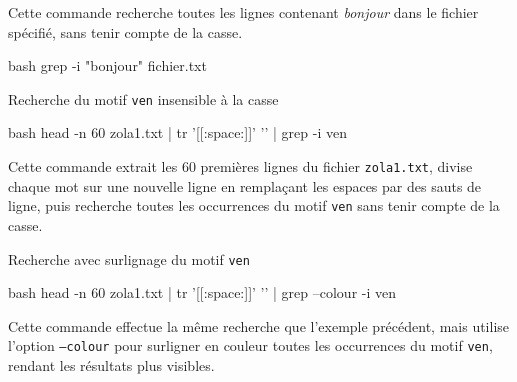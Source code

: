 \documentclass[a4paper, 14pt]{report}
\begin{document}
    \begin{Exemple}
        Cette commande recherche toutes les lignes contenant \textit{bonjour}   
        dans le fichier spécifié, sans tenir compte de la casse. 
\begin{center}
\begin{adjustbox}{max width=\linewidth}
        \begin{cminted}{bash}
grep -i "bonjour" fichier.txt
        \end{cminted}
\end{adjustbox}
\end{center}
    \end{Exemple}



    \begin{Exemple}{Recherche du motif \texttt{ven} insensible à la casse}{}
\begin{center}
  \begin{adjustbox}{max width=\linewidth}
    \begin{cminted}{bash}
head -n 60 zola1.txt | tr '[[:space:]]' '\n' | grep -i ven
    \end{cminted}
  \end{adjustbox}
\end{center}

        Cette commande extrait les 60 premières lignes du fichier \texttt{zola1.txt},
        divise chaque mot sur une nouvelle ligne en remplaçant les espaces par des 
        sauts de ligne, puis recherche toutes les occurrences du motif \texttt{ven}
        sans tenir compte de la casse.
    \end{Exemple}

    \vspace{1em}
    \begin{Exemple}{Recherche avec surlignage du motif \texttt{ven}}{}
\begin{center}
  \begin{adjustbox}{max width=\linewidth}
    \begin{cminted}{bash}
head -n 60 zola1.txt | tr '[[:space:]]' '\n' | grep --colour -i ven
    \end{cminted}
  \end{adjustbox}
\end{center}


        Cette commande effectue la même recherche que l'exemple précédent, mais 
        utilise l'option \texttt{--colour} pour surligner en couleur toutes les 
        occurrences du motif \texttt{ven}, rendant les résultats plus visibles.
    \end{Exemple}
\end{document}

